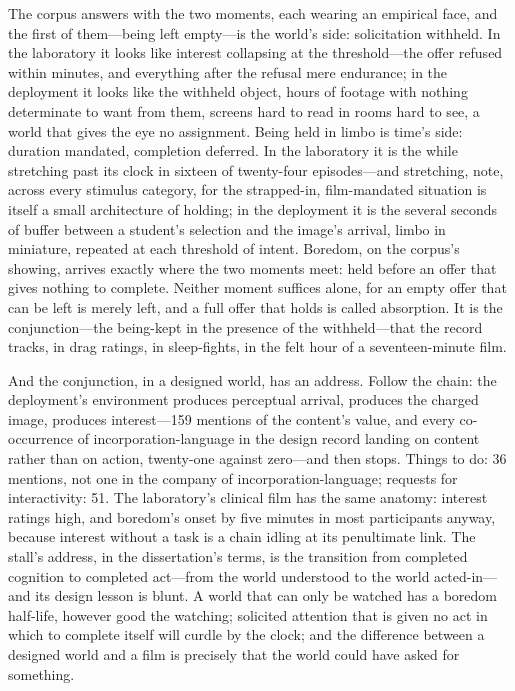 \documentclass{article}
\begin{document}
The corpus answers with the two moments, each wearing an empirical face, and the first of them---being left empty---is the world's side: solicitation withheld. In the laboratory it looks like interest collapsing at the threshold---the offer refused within minutes, and everything after the refusal mere endurance; in the deployment it looks like the withheld object, hours of footage with nothing determinate to want from them, screens hard to read in rooms hard to see, a world that gives the eye no assignment. Being held in limbo is time's side: duration mandated, completion deferred. In the laboratory it is the while stretching past its clock in sixteen of twenty-four episodes---and stretching, note, across every stimulus category, for the strapped-in, film-mandated situation is itself a small architecture of holding; in the deployment it is the several seconds of buffer between a student's selection and the image's arrival, limbo in miniature, repeated at each threshold of intent. Boredom, on the corpus's showing, arrives exactly where the two moments meet: held before an offer that gives nothing to complete. Neither moment suffices alone, for an empty offer that can be left is merely left, and a full offer that holds is called absorption. It is the conjunction---the being-kept in the presence of the withheld---that the record tracks, in drag ratings, in sleep-fights, in the felt hour of a seventeen-minute film.

And the conjunction, in a designed world, has an address. Follow the chain: the deployment's environment produces perceptual arrival, produces the charged image, produces interest---159 mentions of the content's value, and every co-occurrence of incorporation-language in the design record landing on content rather than on action, twenty-one against zero---and then stops. Things to do: 36 mentions, not one in the company of incorporation-language; requests for interactivity: 51. The laboratory's clinical film has the same anatomy: interest ratings high, and boredom's onset by five minutes in most participants anyway, because interest without a task is a chain idling at its penultimate link. The stall's address, in the dissertation's terms, is the transition from completed cognition to completed act---from the world understood to the world acted-in---and its design lesson is blunt. A world that can only be watched has a boredom half-life, however good the watching; solicited attention that is given no act in which to complete itself will curdle by the clock; and the difference between a designed world and a film is precisely that the world could have asked for something.
\end{document}
